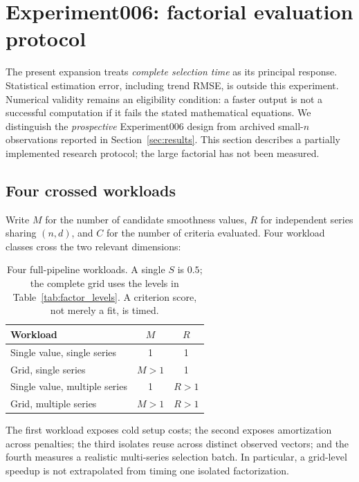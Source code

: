 \section{Experiment006: factorial evaluation protocol}\label{sec:experiment006}
The present expansion treats \emph{complete selection time} as its principal response. Statistical estimation error, including trend RMSE, is outside this experiment. Numerical validity remains an eligibility condition: a faster output is not a successful computation if it fails the stated mathematical equations. We distinguish the \emph{prospective} Experiment006 design from archived small-$n$ observations reported in Section~\ref{sec:results}. This section describes a partially implemented research protocol; the large factorial has not been measured.

\subsection{Four crossed workloads}
Write $M$ for the number of candidate smoothness values, $R$ for independent series sharing $(n,d)$, and $C$ for the number of criteria evaluated. Four workload classes cross the two relevant dimensions:
\begin{table}[t]\caption{Four full-pipeline workloads. A single $S$ is $0.5$; the complete grid uses the levels in Table~\ref{tab:factor_levels}. A criterion score, not merely a fit, is timed.}\label{tab:four}\centering
\begin{tabular}{@{}lcc@{}}\toprule
Workload & $M$ & $R$\\\midrule
Single value, single series & 1 & 1\\
Grid, single series & $M>1$ & 1\\
Single value, multiple series & 1 & $R>1$\\
Grid, multiple series & $M>1$ & $R>1$\\
\bottomrule\end{tabular}
\end{table}
The first workload exposes cold setup costs; the second exposes amortization across penalties; the third isolates reuse across distinct observed vectors; and the fourth measures a realistic multi-series selection batch. In particular, a grid-level speedup is not extrapolated from timing one isolated factorization.


